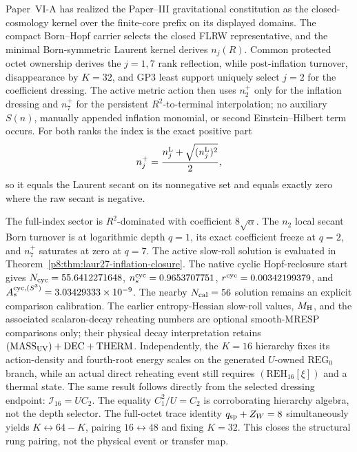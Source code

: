 \documentclass[12pt,a4paper]{article}
\begin{document}
Paper~VI-A has realized the Paper--III gravitational constitution as the
closed-cosmology kernel over the finite-core prefix on its displayed domains.
The compact Born--Hopf carrier selects the closed FLRW representative, and the
minimal Born-symmetric Laurent kernel derives \(n_j(R)\).  Common protected
octet ownership derives the \(j=1,7\) rank reflection, while post-inflation
turnover, disappearance by \(K=32\), and GP3 least support uniquely select
\(j=2\) for the coefficient dressing.  The active
metric action then uses \(n_2^+\) only for the inflation dressing and
\(n_7^+\) for the persistent \(R^2\)-to-terminal interpolation; no auxiliary
\(S(n)\), manually appended inflation monomial, or second Einstein--Hilbert
term occurs.  For both ranks the index is the exact positive part
\[
 n_j^+=\frac{n_j^{\rm L}+\sqrt{(n_j^{\rm L})^2}}2,
\]
so it equals the Laurent secant on its nonnegative set and equals exactly zero
where the raw secant is negative.

The full-index sector is \(R^2\)-dominated with coefficient
\(8\sqrt\alpha\).  The \(n_2\) local secant Born turnover is at logarithmic depth \(q=1\), its exact
coefficient freeze at \(q=2\), and \(n_7^+\) saturates at zero at \(q=7\).
The active slow-roll solution is evaluated in
Theorem~\ref{p8:thm:laur27-inflation-closure}.  The native cyclic
Hopf-reclosure start gives
\(N_{\rm cyc}=55.6412271648\),
\(n_s^{\rm cyc}=0.9653707751\),
\(r^{\rm cyc}=0.00342199379\), and
\(A_s^{{\rm cyc},(S^3)}=3.03429333\times10^{-9}\).  The nearby
\(N_{\rm cal}=56\) solution remains an explicit comparison calibration.
The earlier entropy-Hessian slow-roll values, \(M_{\rm H}\), and the associated
scalaron-decay reheating numbers are optional smooth-MRESP comparisons only;
their physical decay interpretation retains
\((\mathrm{MASS}_{\rm UV})+\mathrm{DEC}+\mathrm{THERM}\).  Independently, the
\(K=16\) hierarchy fixes its action-density and fourth-root energy scales
on the generated \(U\)-owned \(\mathrm{REG}_0\) branch, while an actual direct reheating event
still requires \((\mathrm{REH}_{16}[\xi])\) and a thermal state.
The same result follows directly from the selected dressing endpoint:
\(\mathcal I_{16}=U C_2\).  The equality
\(C_1^2/U=C_2\) is corroborating hierarchy algebra, not the depth selector.
The full-octet trace identity
\(q_{\rm sp}+Z_W=8\) simultaneously yields
\(K\leftrightarrow64-K\), pairing \(16\leftrightarrow48\) and fixing
\(K=32\).  This closes the structural rung pairing, not the physical event
or transfer map.
\end{document}
